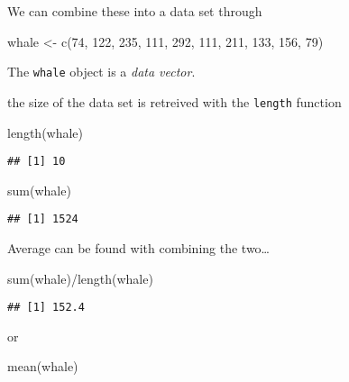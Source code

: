 \documentclass[
]{book}
\newenvironment{Shaded}{\begin{snugshade}}{\end{snugshade}}
\newcommand{\DecValTok}[1]{\textcolor[rgb]{0.00,0.00,0.81}{#1}}
\newcommand{\FunctionTok}[1]{\textcolor[rgb]{0.00,0.00,0.00}{#1}}
\newcommand{\NormalTok}[1]{#1}
\newcommand{\OtherTok}[1]{\textcolor[rgb]{0.56,0.35,0.01}{#1}}
\newcommand{\SpecialCharTok}[1]{\textcolor[rgb]{0.00,0.00,0.00}{#1}}
\theoremstyle{definition}
\theoremstyle{definition}
\theoremstyle{definition}
\theoremstyle{definition}
\theoremstyle{remark}
\begin{document}
We can combine these into a data set through

\begin{Shaded}
\begin{Highlighting}[]
\NormalTok{whale }\OtherTok{\textless{}{-}} \FunctionTok{c}\NormalTok{(}\DecValTok{74}\NormalTok{, }\DecValTok{122}\NormalTok{, }\DecValTok{235}\NormalTok{, }\DecValTok{111}\NormalTok{, }\DecValTok{292}\NormalTok{, }\DecValTok{111}\NormalTok{, }\DecValTok{211}\NormalTok{, }\DecValTok{133}\NormalTok{, }\DecValTok{156}\NormalTok{, }\DecValTok{79}\NormalTok{)}
\end{Highlighting}
\end{Shaded}

The \texttt{whale} object is a \emph{data vector}.

the size of the data set is retreived with the \texttt{length} function

\begin{Shaded}
\begin{Highlighting}[]
\FunctionTok{length}\NormalTok{(whale)}
\end{Highlighting}
\end{Shaded}

\begin{verbatim}
## [1] 10
\end{verbatim}

\begin{Shaded}
\begin{Highlighting}[]
\FunctionTok{sum}\NormalTok{(whale)}
\end{Highlighting}
\end{Shaded}

\begin{verbatim}
## [1] 1524
\end{verbatim}

Average can be found with combining the two\ldots{}

\begin{Shaded}
\begin{Highlighting}[]
\FunctionTok{sum}\NormalTok{(whale)}\SpecialCharTok{/}\FunctionTok{length}\NormalTok{(whale)}
\end{Highlighting}
\end{Shaded}

\begin{verbatim}
## [1] 152.4
\end{verbatim}

or

\begin{Shaded}
\begin{Highlighting}[]
\FunctionTok{mean}\NormalTok{(whale)}
\end{Highlighting}
\end{Shaded}
\end{document}
